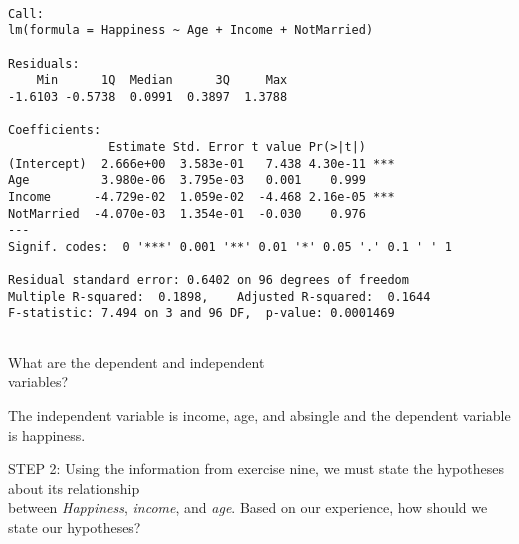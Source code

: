 \documentclass[11pt]{book}\usepackage[]{graphicx}\usepackage[]{color}
\begin{document}
\begin{exercises}
\begin{exercise}
{{}}

{\tiny{
  \begin{verbatim}

Call:
lm(formula = Happiness ~ Age + Income + NotMarried)

Residuals:
    Min      1Q  Median      3Q     Max 
-1.6103 -0.5738  0.0991  0.3897  1.3788 

Coefficients:
              Estimate Std. Error t value Pr(>|t|)    
(Intercept)  2.666e+00  3.583e-01   7.438 4.30e-11 ***
Age          3.980e-06  3.795e-03   0.001    0.999    
Income      -4.729e-02  1.059e-02  -4.468 2.16e-05 ***
NotMarried  -4.070e-03  1.354e-01  -0.030    0.976    
---
Signif. codes:  0 '***' 0.001 '**' 0.01 '*' 0.05 '.' 0.1 ' ' 1

Residual standard error: 0.6402 on 96 degrees of freedom
Multiple R-squared:  0.1898,	Adjusted R-squared:  0.1644 
F-statistic: 7.494 on 3 and 96 DF,  p-value: 0.0001469


  \end{verbatim}
}}

What are the dependent and independent \\ variables?

    \vspace{5mm}

    \end{exercise}
    \vspace{2mm}
    \begin{solution}      %

       The independent variable is income,   age, and absingle and the dependent variable is happiness.

    \end{solution}

  \begin{exercise} %

    STEP 2: Using the information from exercise nine, we must state the hypotheses about its relationship \\ between  {\textit{Happiness}}, {\textit{income}}, and {\textit{age}}.  Based on our experience, how should we state our hypotheses?

    \vspace{5mm}

    \end{exercise}
    \vspace{2mm}
    \begin{solution}      %


\end{solution}
\end{exercises}
\end{document}
